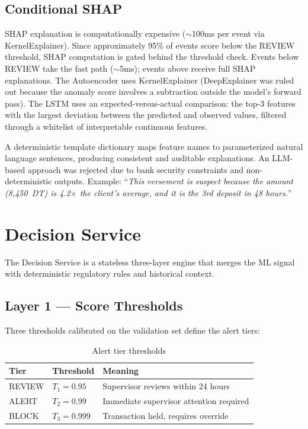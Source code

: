 \subsection{Conditional SHAP}

SHAP explanation is computationally expensive ($\sim$100ms per event via
KernelExplainer). Since approximately 95\% of events score below the REVIEW threshold,
SHAP computation is gated behind the threshold check. Events below REVIEW take the
fast path ($\sim$5ms); events above receive full SHAP explanations. The Autoencoder
uses KernelExplainer (DeepExplainer was ruled out because the anomaly score involves
a subtraction outside the model's forward pass). The LSTM uses an expected-versus-actual
comparison: the top-3 features with the largest deviation between the predicted and
observed values, filtered through a whitelist of interpretable continuous features.

A deterministic template dictionary maps feature names to parameterized natural
language sentences, producing consistent and auditable explanations. An LLM-based
approach was rejected due to bank security constraints and non-deterministic outputs.
Example: ``\textit{This versement is suspect because the amount (8,450~DT) is
4.2$\times$ the client's average, and it is the 3rd deposit in 48 hours.}''

\section{Decision Service}

The Decision Service is a stateless three-layer engine that merges the ML signal with
deterministic regulatory rules and historical context.

\subsection{Layer 1 --- Score Thresholds}

Three thresholds calibrated on the validation set define the alert tiers:

\begin{table}[H]
\centering
\caption{Alert tier thresholds}
\label{tab:alert-tiers}
\begin{tabular}{@{}llp{7cm}@{}}
\toprule
\textbf{Tier} & \textbf{Threshold} & \textbf{Meaning} \\
\midrule
REVIEW & $T_1 = 0.95$ & Supervisor reviews within 24 hours \\
ALERT  & $T_2 = 0.99$ & Immediate supervisor attention required \\
BLOCK  & $T_3 = 0.999$ & Transaction held, requires override \\
\bottomrule
\end{tabular}
\end{table}

